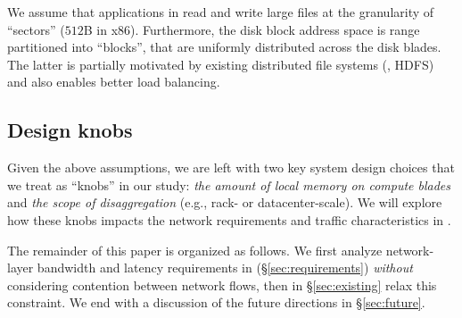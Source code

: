 
We assume that applications in \dis read and write large files at the granularity of ``sectors'' ($512$B in x86). Furthermore, the disk block address space is range partitioned into ``blocks'', that are uniformly distributed across the disk blades. The latter is partially motivated by existing distributed file systems (\eg, HDFS) and also enables better load balancing. %
%
\subsection{Design knobs}
\label{ssec:knobs}
Given the above assumptions, we are left with two key system design choices that we treat as ``knobs'' in our study: {\em the amount of local memory on compute blades} and  {\em the scope of disaggregation} (e.g., rack- or datacenter-scale). We will explore how these knobs impacts the network requirements and traffic characteristics in \dis. 

The remainder of this paper is organized as follows. We first analyze network-layer bandwidth and latency requirements in \dis(\S\ref{sec:requirements}) \emph{without} considering contention between network flows, then in \S\ref{sec:existing} relax this constraint. We end with a discussion of the future directions in \S\ref{sec:future}.